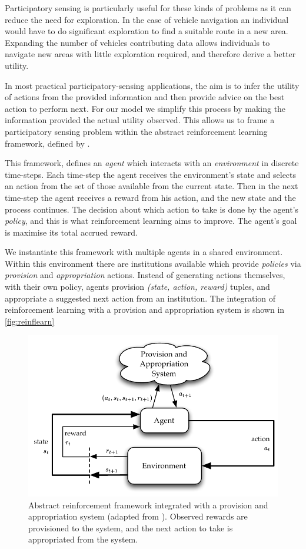 Participatory sensing is particularly useful for these kinds of problems as it
can reduce the need for exploration. In the case of vehicle navigation an
individual would have to do significant exploration to find a suitable route
in a new area. Expanding the number of vehicles contributing data allows
individuals to navigate new areas with little exploration required, and
therefore derive a better utility.

In most practical participatory-sensing applications, the aim is to infer the
utility of actions from the provided information and then provide advice on
the best action to perform next. For our model we simplify this process by
making the information provided the actual utility observed. This allows us
to frame a participatory sensing problem within the abstract reinforcement
learning framework, defined by \citet{Sutton1998}.

This framework, defines an \emph{agent} which interacts with an
\emph{environment} in discrete time-steps. Each time-step the agent receives
the environment's state and selects an action from the set of those available
from the current state. Then in the next time-step the agent receives a reward
from his action, and the new state and the process continues. The decision
about which action to take is done by the agent's \emph{policy}, and this is
what reinforcement learning aims to improve. The agent's goal is maximise its
total accrued reward.

We instantiate this framework with multiple agents in a shared environment.
Within this environment there are institutions available which provide
\emph{policies} via \emph{provision} and \emph{appropriation} actions. Instead
of generating actions themselves, with their own policy, agents provision
\emph{(state, action, reward)} tuples, and appropriate a suggested next action
from an institution. 
The integration of reinforcement learning with a provision and appropriation system is shown in \autoref{fig:reinflearn} %

\begin{figure}
\centering
\includegraphics{gfx/reinforcementlearning}
\caption{Abstract reinforcement framework integrated with a provision and appropriation system (adapted from \citet{Sutton1998}). Observed rewards are provisioned to the system, and the next action to take is appropriated from the system.}\label{fig:reinflearn}
\end{figure}

